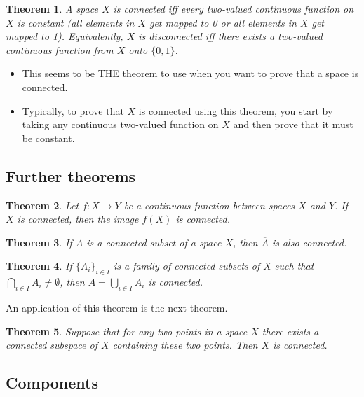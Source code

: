 \documentclass[two column]{article}
\newtheorem{theorem}{Theorem}[subsection]
\begin{document}
\begin{theorem}
A space $X$ is connected iff every two-valued continuous function on $X$ is constant (all elements in $X$ get mapped to 0 or all elements in $X$ get mapped to 1). Equivalently, $X$ is disconnected iff there exists a two-valued continuous function from $X$ onto $\{0,1\}$.
\end{theorem}
\begin{itemize} \vspace{-6pt}
\item This seems to be THE theorem to use when you want to prove that a space is connected. \vspace{-6pt}
\item Typically, to prove that $X$ is connected using this theorem, you start by taking any continuous two-valued function on $X$ and then prove that it must be constant. 
\end{itemize}

\subsection{Further theorems}

\begin{theorem}
Let $f : X \rightarrow Y$ be a continuous function between spaces $X$ and $Y$. If $X$ is connected, then the image $f(X)$ is connected. \\
\end{theorem}

\begin{theorem}
If $A$ is a connected subset of a space $X$, then $\overline{A}$ is also connected. \\
\end{theorem}

\begin{theorem}
If $\{A_{i}\}_{i \in I}$ is a family of connected subsets of $X$ such that $\bigcap_{i \in I} A_{i} \neq \emptyset$, then $A = \bigcup_{i \in I} A_{i}$ is connected. 
\end{theorem}

An application of this theorem is the next theorem. \\

\begin{theorem}
Suppose that for any two points in a space $X$ there exists a connected subspace of $X$ containing these two points. Then $X$ is connected.
\end{theorem}

\subsection{Components}
\end{document}
